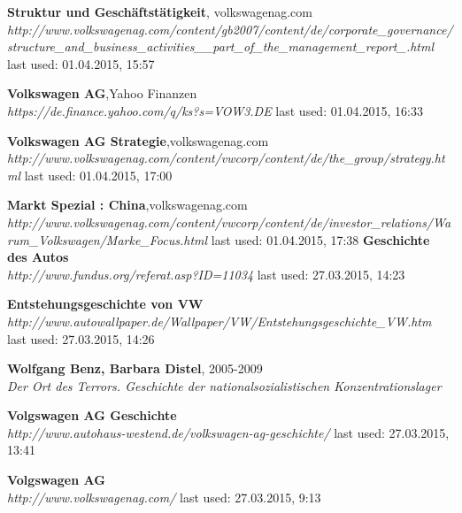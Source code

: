 \documentclass[12pt]{article}
\begin{document}
\begin{thebibliography}{56}
 \textbf{Struktur und Geschäftstätigkeit}, volkswagenag.com \\
  \textit{	http://www.volkswagenag.com/content/gb2007/content/de/corporate\_governance/structure\_and\_business\_activities\_\_part\_of\_the\_management\_report\_.html}
  \newline last used: 01.04.2015, 15:57  

 \textbf{Volkswagen AG},Yahoo Finanzen \\
  \textit{  https://de.finance.yahoo.com/q/ks?s=VOW3.DE}
  \newline last used: 01.04.2015, 16:33  
  
 \textbf{Volkswagen AG Strategie},volkswagenag.com \\
  \textit{http://www.volkswagenag.com/content/vwcorp/content/de/the\_group/strategy.html}
  \newline last used: 01.04.2015, 17:00  
    
 \textbf{Markt Spezial : China},volkswagenag.com \\
  \textit{http://www.volkswagenag.com/content/vwcorp/content/de/investor\_relations/Warum\_Volkswagen/Marke\_Focus.html
}
  \newline last used: 01.04.2015, 17:38
  \textbf{Geschichte des Autos} \\
  \textit{
  	http://www.fundus.org/referat.asp?ID=11034
  }
  \newline last used: 27.03.2015, 14:23
  
  
  \textbf{Entstehungsgeschichte von VW} \\
  \textit{
  	http://www.autowallpaper.de/Wallpaper/VW/Entstehungsgeschichte\_VW.htm
  }
  \newline last used: 27.03.2015, 14:26
  
  \textbf{Wolfgang Benz, Barbara Distel}, 2005-2009 \\
  \textit{
  	Der Ort des Terrors. Geschichte der nationalsozialistischen Konzentrationslager
  }
  
  
  \textbf{Volgswagen AG Geschichte} \\
  \textit{
  	http://www.autohaus-westend.de/volkswagen-ag-geschichte/
  }
  \newline last used: 27.03.2015, 13:41
  
  \textbf{Volgswagen AG} \\
  \textit{
  	http://www.volkswagenag.com/
  }
  \newline last used: 27.03.2015, 9:13
  

\end{thebibliography}
\end{document}
